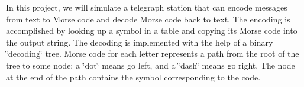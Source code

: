 In this project, we will simulate a telegraph station that can encode messages from text to Morse code and decode Morse code back to text. The encoding is accomplished by looking up a symbol in a table and copying its Morse code into the output string. The decoding is implemented with the help of a binary \char`\"{}decoding\char`\"{} tree. Morse code for each letter represents a path from the root of the tree to some node\+: a \char`\"{}dot\char`\"{} means go left, and a \char`\"{}dash\char`\"{} means go right. The node at the end of the path contains the symbol corresponding to the code. 